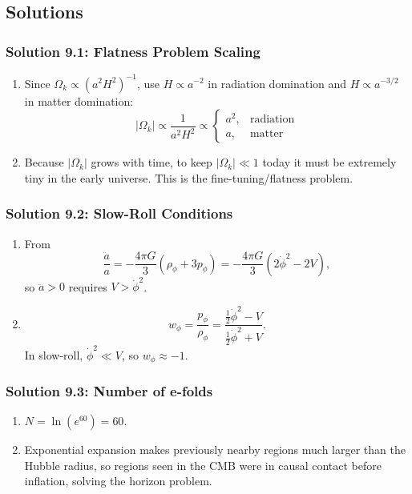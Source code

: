 \bigskip
\bigskip
\bigskip

\subsection{Solutions}

\subsubsection*{Solution 9.1: Flatness Problem Scaling}

\begin{enumerate}[label=(\alph*)]
  \item Since $\Omega_k\propto (a^2H^2)^{-1}$, use $H\propto a^{-2}$ in radiation domination and
  $H\propto a^{-3/2}$ in matter domination:
  \[
    |\Omega_k|\propto \frac{1}{a^2H^2} \propto \begin{cases}
      a^2, & \text{radiation} \\
      a, & \text{matter}
    \end{cases}
  \]

  \item Because $|\Omega_k|$ grows with time, to keep $|\Omega_k|\ll 1$ today it must be extremely
  tiny in the early universe. This is the fine-tuning/flatness problem.
\end{enumerate}

\subsubsection*{Solution 9.2: Slow-Roll Conditions}

\begin{enumerate}[label=(\alph*)]
  \item From
  \[
    \frac{\ddot a}{a}=-\frac{4\pi G}{3}(\rho_\phi+3p_\phi)
    =-\frac{4\pi G}{3}\left(2\dot\phi^2-2V\right),
  \]
  so $\ddot a>0$ requires $V>\dot\phi^2$.

  \item
  \[
    w_\phi=\frac{p_\phi}{\rho_\phi}=
    \frac{\tfrac12\dot\phi^2-V}{\tfrac12\dot\phi^2+V}.
  \]
  In slow-roll, $\dot\phi^2\ll V$, so $w_\phi\approx -1$.
\end{enumerate}

\subsubsection*{Solution 9.3: Number of e-folds}

\begin{enumerate}[label=(\alph*)]
  \item $N=\ln(e^{60})=60$.

  \item Exponential expansion makes previously nearby regions much larger than the Hubble radius,
  so regions seen in the CMB were in causal contact before inflation, solving the horizon problem.
\end{enumerate}

